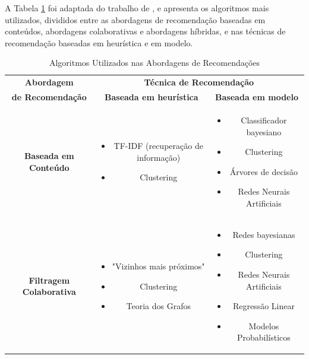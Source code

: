 A Tabela \ref{tab01} foi adaptada do trabalho de , e apresenta os algoritmos mais utilizados, 
divididos entre as abordagens de recomendação baseadas em conteúdos, abordagens colaborativas e 
abordagens híbridas, e nas técnicas de recomendação baseadas em heurística e em modelo. 

\begin{table}[ht]
	\centering
	\caption{Algoritmos Utilizados nas Abordagens de Recomendações}
	\label{tab01}
	\begin{tabular}{ccc}
	\toprule
	 \textbf{Abordagem} & \multicolumn{2}{c}{ \textbf{Técnica de Recomendação}} \\  
	\textbf{de Recomendação}
	\multirow{-2}{*}{} &  \textbf{Baseada em heurística} & \textbf{Baseada em modelo} \\ 
	\midrule
	\textbf{Baseada em Conteúdo	}   & \begin{minipage} [t] {0.3\textwidth} \begin{itemize} \item TF-IDF (recuperação de informação) \item Clustering \end{itemize} \end{minipage} & \begin{minipage} [t] {0.3\textwidth} \begin{itemize} \item Classificador bayesiano \item Clustering \item Árvores de decisão \item Redes Neurais Artificiais \end{itemize} \end{minipage} \\ 
	\midrule

	\textbf{Filtragem Colaborativa}	& \begin{minipage} [t] {0.3\textwidth} \begin{itemize} \item "Vizinhos mais próximos" \item Clustering \item Teoria dos Grafos \end{itemize} \end{minipage} & \begin{minipage} [t] {0.3\textwidth} \begin{itemize} \item  Redes bayesianas \item Clustering \item Redes Neurais Artificiais \item Regressão Linear \item Modelos Probabilísticos \end{itemize} \end{minipage} \\ 
	\midrule


\end{tabular}
\end{table}

